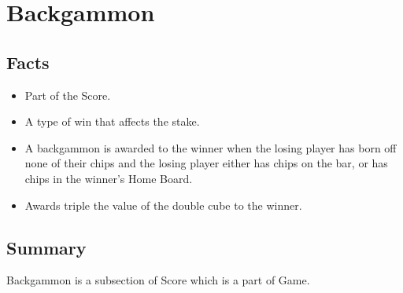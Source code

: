 \section{Backgammon}

\subsection{Facts}
\begin{itemize} [itemsep=2pt,parsep=2pt]
    \item Part of the Score.
    \item A type of win that affects the stake.
    \item A backgammon is awarded to the winner when the losing player has born off none of their chips and the losing player either has chips on the bar, or has chips in the winner's Home Board.
    \item Awards triple the value of the double cube to the winner.
\end{itemize}


\subsection{Summary}
Backgammon is a subsection of Score which is a part of Game.
